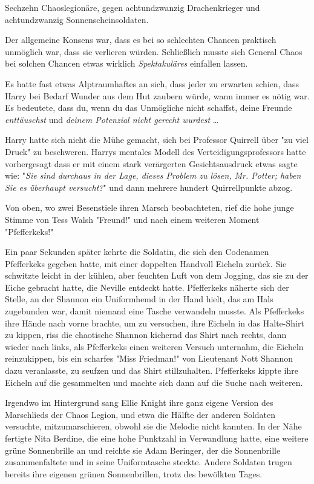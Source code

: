 {Sechzehn Chaoslegionäre, gegen achtundzwanzig Drachenkrieger und achtundzwanzig Sonnenscheinsoldaten.

Der allgemeine Konsens war, dass es bei so schlechten Chancen praktisch unmöglich war, dass sie verlieren würden. Schließlich musste sich General Chaos bei solchen Chancen etwas wirklich \emph{Spektakuläres} einfallen lassen.

Es hatte fast etwas Alptraumhaftes an sich, dass jeder zu erwarten schien, dass Harry bei Bedarf Wunder aus dem Hut zaubern würde, wann immer es nötig war. Es bedeutete, dass du, wenn du das Unmögliche nicht schaffst, deine Freunde \emph{enttäuschst} und \emph{deinem Potenzial nicht gerecht wurdest} …

Harry hatte sich nicht die Mühe gemacht, sich bei Professor Quirrell über "zu viel Druck" zu beschweren. Harrys mentales Modell des Verteidigungsprofessors hatte vorhergesagt dass er mit einem stark verärgerten Gesichtsausdruck etwas sagte wie: "\emph{Sie sind durchaus in der Lage, dieses Problem zu lösen, Mr. Potter; haben Sie es überhaupt versucht?}" und dann mehrere hundert Quirrellpunkte abzog.

Von oben, wo zwei Besenstiele ihren Marsch beobachteten, rief die hohe junge Stimme von Tess Walsh "Freund!" und nach einem weiteren Moment "Pfefferkeks!"

Ein paar Sekunden später kehrte die Soldatin, die sich den Codenamen Pfefferkeks gegeben hatte, mit einer doppelten Handvoll Eicheln zurück. Sie schwitzte leicht in der kühlen, aber feuchten Luft von dem Jogging, das sie zu der Eiche gebracht hatte, die Neville entdeckt hatte. Pfefferkeks näherte sich der Stelle, an der Shannon ein Uniformhemd in der Hand hielt, das am Hals zugebunden war, damit niemand eine Tasche verwandeln musste. Als Pfefferkeks ihre Hände nach vorne brachte, um zu versuchen, ihre Eicheln in das Halte-Shirt zu kippen, riss die chaotische Shannon kichernd das Shirt nach rechts, dann wieder nach links, als Pfefferkeks einen weiteren Versuch unternahm, die Eicheln reinzukippen, bis ein scharfes "Miss Friedman!" von Lieutenant Nott Shannon dazu veranlasste, zu seufzen und das Shirt stillzuhalten. Pfefferkeks kippte ihre Eicheln auf die gesammelten und machte sich dann auf die Suche nach weiteren.

Irgendwo im Hintergrund sang Ellie Knight ihre ganz eigene Version des Marschlieds der Chaos Legion, und etwa die Hälfte der anderen Soldaten versuchte, mitzumarschieren, obwohl sie die Melodie nicht kannten. In der Nähe fertigte Nita Berdine, die eine hohe Punktzahl in Verwandlung hatte, eine weitere grüne Sonnenbrille an und reichte sie Adam Beringer, der die Sonnenbrille zusammenfaltete und in seine Uniformtasche steckte. Andere Soldaten trugen bereits ihre eigenen grünen Sonnenbrillen, trotz des bewölkten Tages.

}
